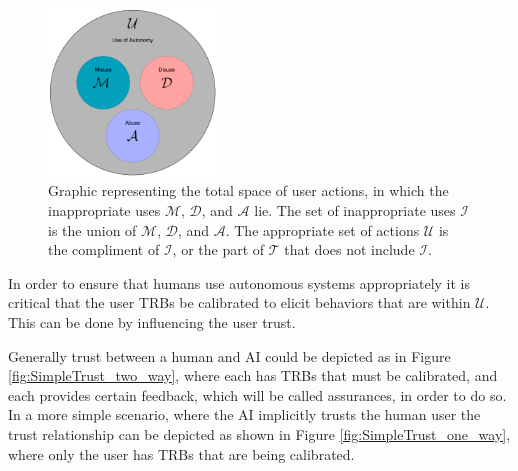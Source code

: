 	\begin{figure}[htbp]
    	\centering
     	\includegraphics[width=0.4\textwidth]{Figures/misuse_disuse_abuse}
    	\caption{Graphic representing the total space of user actions, in which the inappropriate uses $\mathcal{M}$, $\mathcal{D}$, and $\mathcal{A}$ lie. The set of inappropriate uses $\mathcal{I}$ is the union of $\mathcal{M}$, $\mathcal{D}$, and $\mathcal{A}$. The appropriate set of actions $\mathcal{U}$ is the compliment of $\mathcal{I}$, or the part of $\mathcal{T}$ that does not include $\mathcal{I}$.}
        \label{fig:appropriate_use}
    \end{figure}
    
    In order to ensure that humans use autonomous systems appropriately it is critical that the user TRBs be calibrated to elicit behaviors that are within $\mathcal{U}$. This can be done by influencing the user trust.

    Generally trust between a human and AI could be depicted as in Figure \ref{fig:SimpleTrust_two_way}, where each has TRBs that must be calibrated, and each provides certain feedback, which will be called assurances, in order to do so. In a more simple scenario, where the AI implicitly trusts the human user the trust relationship can be depicted as shown in Figure \ref{fig:SimpleTrust_one_way}, where only the user has TRBs that are being calibrated.

    
